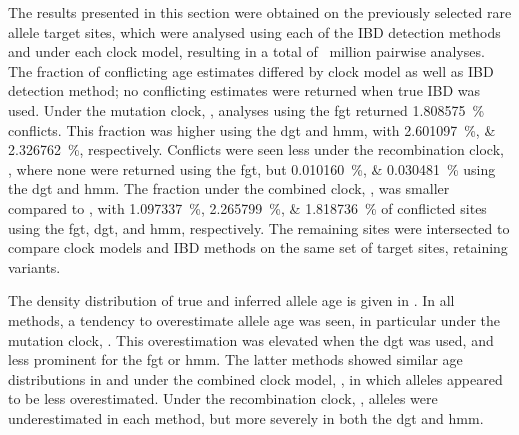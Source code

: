 The results presented in this section were obtained on the previously selected  rare allele target sites, which were analysed using each of the  IBD detection methods and under each clock model, resulting in a total of ~million pairwise analyses.
The fraction of conflicting age estimates differed by clock model as well as IBD detection method; no conflicting estimates were returned when true IBD was used.
Under the mutation clock, \ClockM, analyses using the \gls{fgt} returned \SI{1.808575}{\percent} conflicts.
This fraction was higher using the \gls{dgt} and \gls{hmm}, with \SIlist{2.601097;2.326762}{\percent}, respectively.
Conflicts were seen less under the recombination clock, \ClockR, where none were returned using the \gls{fgt}, but \SIlist{0.010160;0.030481}{\percent} using the \gls{dgt} and \gls{hmm}.
The fraction under the combined clock, \ClockC, was smaller compared to \ClockM, with
\SIlist{1.097337;2.265799;1.818736}{\percent} of conflicted sites using the \gls{fgt}, \gls{dgt}, and \gls{hmm}, respectively.
The remaining sites were intersected to compare clock models and IBD methods on the same set of target sites, retaining  variants.

%

%

The density distribution of true and inferred allele age is given in .
In all  methods, a tendency to overestimate allele age was seen, in particular under the mutation clock, \ClockM.
This overestimation was elevated when the \gls{dgt} was used, and less prominent for the \gls{fgt} or \gls{hmm}.
The latter methods showed similar age distributions in \ClockM and under the combined clock model, \ClockC, in which alleles appeared to be less overestimated.
Under the recombination clock, \ClockR, alleles were underestimated in each method, but more severely in both the \gls{dgt} and \gls{hmm}.

